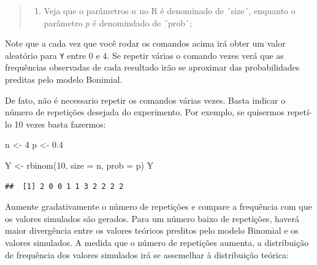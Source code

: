 \documentclass[
]{book}
\newenvironment{Shaded}{\begin{snugshade}}{\end{snugshade}}
\newcommand{\AttributeTok}[1]{\textcolor[rgb]{0.77,0.63,0.00}{#1}}
\newcommand{\DecValTok}[1]{\textcolor[rgb]{0.00,0.00,0.81}{#1}}
\newcommand{\FloatTok}[1]{\textcolor[rgb]{0.00,0.00,0.81}{#1}}
\newcommand{\FunctionTok}[1]{\textcolor[rgb]{0.00,0.00,0.00}{#1}}
\newcommand{\NormalTok}[1]{#1}
\newcommand{\OtherTok}[1]{\textcolor[rgb]{0.56,0.35,0.01}{#1}}
\providecommand{\tightlist}{%
  \setlength{\itemsep}{0pt}\setlength{\parskip}{0pt}}
\begin{document}
\begin{quote}
\begin{enumerate}
\def\labelenumi{\arabic{enumi}.}
\setcounter{enumi}{2}
\tightlist
\item
  Veja que o parâmetros \(n\) no R é denominado de ´size´, enquanto o parâmetro \(p\) é denomindado de ´prob´;
\end{enumerate}
\end{quote}

Note que a cada vez que você rodar os comandos acima irá obter um valor aleatório para \texttt{Y} entre \(0\) e \(4\). Se repetir várias o comando vezes verá que as frequências observadas de cada resultado irão se aproximar das probabilidades preditas pelo modelo Bonimial.

De fato, não é necessario repetir os comandos várias vezes. Basta indicar o número de repetições desejada do experimento. Por exemplo, se quisermos repetí-lo 10 vezes basta fazermos:

\begin{Shaded}
\begin{Highlighting}[]
\NormalTok{n }\OtherTok{\textless{}{-}} \DecValTok{4}
\NormalTok{p }\OtherTok{\textless{}{-}} \FloatTok{0.4}

\NormalTok{Y }\OtherTok{\textless{}{-}} \FunctionTok{rbinom}\NormalTok{(}\DecValTok{10}\NormalTok{, }\AttributeTok{size =}\NormalTok{ n, }\AttributeTok{prob =}\NormalTok{ p)}
\NormalTok{Y}
\end{Highlighting}
\end{Shaded}

\begin{verbatim}
##  [1] 2 0 0 1 1 3 2 2 2 2
\end{verbatim}

Aumente gradativamente o número de repetições e compare a frequência com que os valores simulados são gerados. Para um número baixo de repetições, haverá maior divergência entre os valores teóricos preditos pelo modelo Binomial e os valores simulados. A medida que o número de repetições aumenta, a distribuição de frequência dos valores simulados irá se assemelhar à distribuição teórica:
\end{document}
